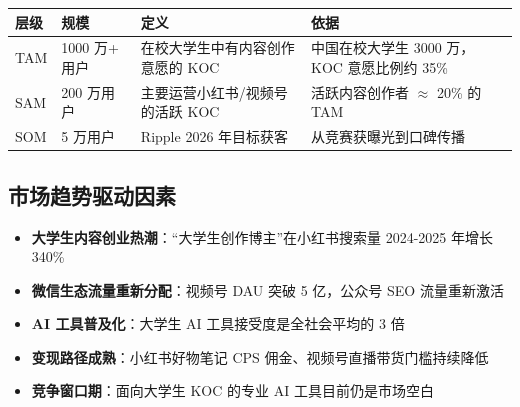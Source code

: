 \documentclass[12pt,a4paper]{ctexart}
\begin{document}
\begin{center}
\end{center}

\begin{center}
\begin{tabular}{p{2cm} p{3.5cm} p{3.5cm} p{5cm}}
\toprule
\textbf{层级} & \textbf{规模} & \textbf{定义} & \textbf{依据} \\
\midrule
TAM & 1000 万+ 用户 & 在校大学生中有内容创作意愿的 KOC & 中国在校大学生 3000 万，KOC 意愿比例约 35\% \\[3pt]
SAM & 200 万用户 & 主要运营小红书/视频号的活跃 KOC & 活跃内容创作者 $\approx$ 20\% 的 TAM \\[3pt]
SOM & 5 万用户 & Ripple 2026 年目标获客 & 从竞赛获曝光到口碑传播 \\
\bottomrule
\end{tabular}
\end{center}

\subsection{市场趋势驱动因素}

\begin{itemize}
  \item \textbf{大学生内容创业热潮}：``大学生创作博主''在小红书搜索量 2024-2025 年增长 340\%
  \item \textbf{微信生态流量重新分配}：视频号 DAU 突破 5 亿，公众号 SEO 流量重新激活
  \item \textbf{AI 工具普及化}：大学生 AI 工具接受度是全社会平均的 3 倍
  \item \textbf{变现路径成熟}：小红书好物笔记 CPS 佣金、视频号直播带货门槛持续降低
  \item \textbf{竞争窗口期}：面向大学生 KOC 的专业 AI 工具目前仍是市场空白
\end{itemize}
\end{document}
